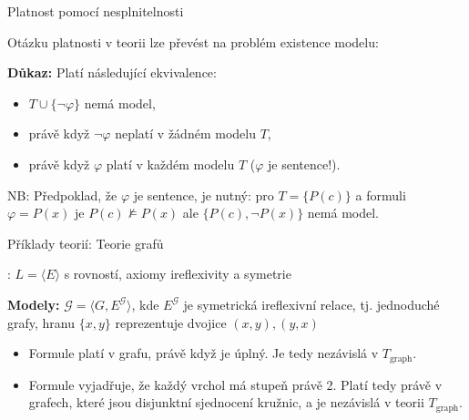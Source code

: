 \documentclass{beamer}
\begin{document}
\begin{frame}{Platnost pomocí nesplnitelnosti}

    Otázku platnosti v teorii lze převést na problém existence modelu:

    \medskip

    \pause

    \medskip

    \pause
    \textbf{Důkaz:}
        Platí následující ekvivalence:\pause
        \begin{itemize}
            \item $T\cup\{\neg\varphi\}$ nemá model,\pause
            \item právě když $\neg\varphi$ neplatí v žádném modelu $T$,\pause
            \item právě když $\varphi$ platí v každém modelu $T$  ($\varphi$ je sentence!). \hfill\qedsymbol
        \end{itemize}

    \pause
    NB: Předpoklad, že $\varphi$ je sentence, je nutný: pro $T=\{P(c)\}$ a formuli $\varphi=P(x)$ je $P(c)\not\models P(x)$ ale $\{P(c),\neg P(x)\}$ nemá model.

\end{frame}


\begin{frame}{Příklady teorií: Teorie grafů}
    
    \pause
    : $L=\langle E\rangle$ s rovností, axiomy \alert{ireflexivity} a \alert{symetrie}
    
    \pause

    \pause
    \textbf{Modely:} $\mathcal G=\langle G,E^\mathcal G\rangle$, kde $E^\mathcal G$ je symetrická ireflexivní relace, tj. \alert{jednoduché} grafy, hranu $\{x,y\}$ reprezentuje dvojice $(x,y),(y,x)$\pause
    \begin{itemize}
        \item Formule  platí v grafu, právě když je \alert{úplný}. Je tedy nezávislá v $T_\text{graph}$.\pause
        \item Formule   vyjadřuje, že každý vrchol má stupeň právě 2. \pause
        Platí tedy právě v grafech, které jsou disjunktní sjednocení kružnic, a je nezávislá v teorii $T_\text{graph}$.
    \end{itemize}

\end{frame}
\end{document}
